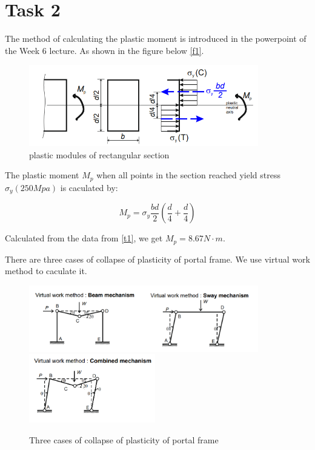 \section{Task 2}
\FloatBarrier %




\iffalse
The method of calculating the plastic moment is introduced in the powerpoint of the Week 6 lecture. As shown in the figure below \autoref{f1}.

\begin{figure}
    \centering
    \includegraphics[width=10cm]{./fig/11.png}
    \caption{plastic modules of rectangular section  }
    \label{f1}
\end{figure}

The plastic moment $M_p$ when all points in the section reached
yield stress $\sigma_y(250Mpa)$ is caculated by:

\begin{equation} 
    M_p=\sigma_y\frac{bd}{2}(\frac{d}{4}+\frac{d}{4})
    \label{e1}
\end{equation}

Calculated from the data from \autoref{t1}, we get $M_p=8.67N \cdot m$.

There are three cases of collapse of plasticity of portal frame. We use virtual work method to caculate it.

\begin{figure}[htbp]
    \centering
    \includegraphics[width=10cm]{./fig/12.png}
    \includegraphics[width=5.5cm]{./fig/13.png}
    \caption{Three cases of collapse of plasticity of portal frame}
    \label{f2}
\end{figure}


